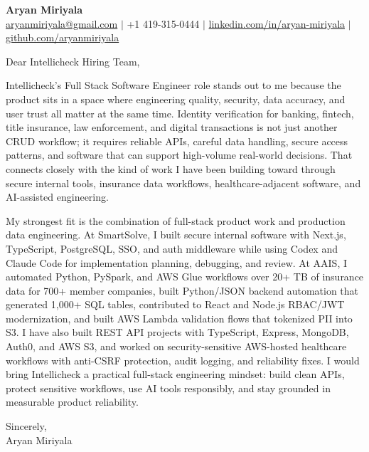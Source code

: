 \documentclass[11pt]{letter}
\begin{document}
\begin{center}
{\Large \textbf{Aryan Miriyala}}\\
\href{mailto:aryanmiriyala@gmail.com}{aryanmiriyala@gmail.com} $|$ +1 419-315-0444 $|$
\href{https://www.linkedin.com/in/aryan-miriyala-7788a21b6/}{linkedin.com/in/aryan-miriyala} $|$
\href{https://github.com/aryanmiriyala}{github.com/aryanmiriyala}
\end{center}

\vspace{0.25in}

Dear Intellicheck Hiring Team,

Intellicheck's Full Stack Software Engineer role stands out to me because the product sits in a space where engineering quality, security, data accuracy, and user trust all matter at the same time. Identity verification for banking, fintech, title insurance, law enforcement, and digital transactions is not just another CRUD workflow; it requires reliable APIs, careful data handling, secure access patterns, and software that can support high-volume real-world decisions. That connects closely with the kind of work I have been building toward through secure internal tools, insurance data workflows, healthcare-adjacent software, and AI-assisted engineering.

My strongest fit is the combination of full-stack product work and production data engineering. At SmartSolve, I built secure internal software with Next.js, TypeScript, PostgreSQL, SSO, and auth middleware while using Codex and Claude Code for implementation planning, debugging, and review. At AAIS, I automated Python, PySpark, and AWS Glue workflows over 20+ TB of insurance data for 700+ member companies, built Python/JSON backend automation that generated 1,000+ SQL tables, contributed to React and Node.js RBAC/JWT modernization, and built AWS Lambda validation flows that tokenized PII into S3. I have also built REST API projects with TypeScript, Express, MongoDB, Auth0, and AWS S3, and worked on security-sensitive AWS-hosted healthcare workflows with anti-CSRF protection, audit logging, and reliability fixes. I would bring Intellicheck a practical full-stack engineering mindset: build clean APIs, protect sensitive workflows, use AI tools responsibly, and stay grounded in measurable product reliability.

\vspace{0.15in}

Sincerely,\\
Aryan Miriyala
\end{document}
